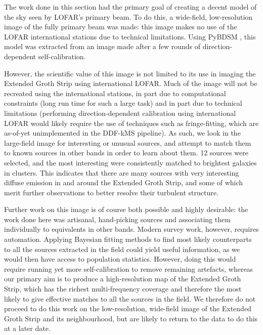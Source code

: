 \pg
The work done in this section had the primary goal of creating a decent model of the sky seen by LOFAR's primary beam. To do this, a wide-field, low-resolution image of the fully primary beam was made: this image makes no use of the LOFAR international stations due to technical limitations. Using PyBDSM , this model was extracted from an image made after a few rounds of direction-dependent self-calibration.

\pg
However, the scientific value of this image is not limited to its use in imaging the Extended Groth Strip using international LOFAR. Much of the image will not be recreated using the international stations, in part due to computational constraints (long run time for such a large task) and in part due to technical limitations (performing direction-dependent calibration using international LOFAR would likely require the use of techniques such as fringe-fitting, which are as-of-yet unimplemented in the DDF-kMS pipeline). As such, we look in the large-field image for interesting or unusual sources, and attempt to match them to known sources in other bands in order to learn about them. 12 sources were selected, and the most interesting were consistently matched to brightest galaxies in clusters. This indicates that there are many sources with very interesting diffuse emission in and around the Extended Groth Strip, and some of which merit further observations to better resolve their turbulent structure.

\pg
Further work on this image is of course both possible and highly desirable: the work done here was artisanal, hand-picking sources and associating them individually to equivalents in other bands. Modern survey work, however, requires automation. Applying Bayesian fitting methods to find most likely counterparts to all the sources extracted in the field could yield useful information, as we would then have access to population statistics. However, doing this would require running yet more self-calibration to remove remaining artefacts, whereas our primary aim is to produce a high-resolution map of the Extended Groth Strip, which has the richest multi-frequency coverage and therefore the most likely to give effective matches to all the sources in the field. We therefore do not proceed to do this work on the low-resolution, wide-field image of the Extended Groth Strip and its neighbourhood, but are likely to return to the data to do this at a later date.



\clearpage